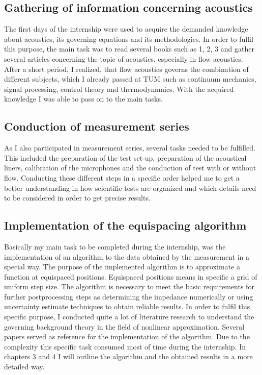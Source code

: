 \documentclass[11pt]{report} %
\begin{document}
\subsection{Gathering of information concerning acoustics } 
The first days of the internship were used to acquire the demanded knowledge about acoustics, its governing equations and its methodologies.
In order to fulfil this purpose, the main task was to read several books such as 1, 2, 3 and gather several articles concerning the topic of acoustics, especially in flow acoustics. 
After a short period, I realized, that flow acoustics governs the combination of different subjects, which I already passed at TUM such as continuum mechanics, signal processing, control theory and thermodynamics.
With the acquired knowledge I was able to pass on to the main tasks. 

\subsection{Conduction of measurement series}
As I also participated in measurement series, several tasks needed to be fulfilled.
This included the preparation of the test set-up, preparation of the acoustical liners, calibration of the microphones and the conduction of test with or without flow.
Conducting these different steps in a specific order helped me to get a better understanding in how scientific tests are organized and which details need to be considered in order to get precise results. 

\subsection{Implementation of the equispacing algorithm}
Basically my main task to be completed during the internship, was the implementation of an algorithm to  the data obtained by the measurement in a special way. 
The purpose of the implemented algorithm is to approximate a function at equispaced positions. 
Equispaced positions means in specific a grid of uniform step size. 
The algorithm is necessary to meet the basic requirements for further postprocessing steps as determining the impedance numerically or using uncertainty estimate techniques to obtain reliable results.  
In order to fulfil this specific purpose, I conducted quite a lot of literature research to understand the governing background theory in the field of nonlinear approximation.
Several papers served as reference for the implementation of the algorithm. 
Due to the complexity this specific task consumed most of time during the internship.
In chapters 3 and 4 I will outline the algorithm and the obtained results in a more detailed way.
 
\end{document}
